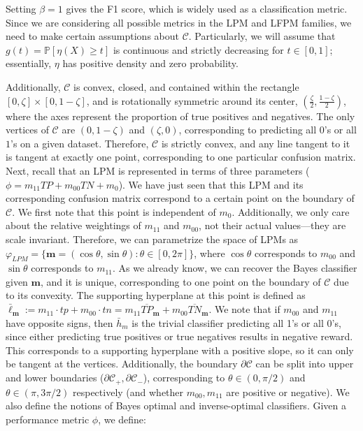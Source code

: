 \documentclass[
  letterpaper,
  numbers=noenddot,
  DIV=11]{scrreprt}
\theoremstyle{plain}
\theoremstyle{definition}
\theoremstyle{remark}
\begin{document}
Setting \(\beta = 1\) gives the F1 score, which is widely used as a
classification metric. Since we are considering all possible metrics in
the LPM and LFPM families, we need to make certain assumptions about
\(\mathcal{C}\). Particularly, we will assume that
\(g(t) = \mathbb{P}[\eta(X) \geq t]\) is continuous and strictly
decreasing for \(t \in [0, 1]\); essentially, \(\eta\) has positive
density and zero probability.

Additionally, \(\mathcal{C}\) is convex, closed, and contained within
the rectangle \([0, \zeta] \times [0, 1-\zeta]\), and is rotationally
symmetric around its center, \((\frac{\zeta}{2}, \frac{1-\zeta}{2})\),
where the axes represent the proportion of true positives and negatives.
The only vertices of \(\mathcal{C}\) are \((0, 1-\zeta)\) and
\((\zeta, 0)\), corresponding to predicting all \(0\)'s or all \(1\)'s
on a given dataset. Therefore, \(\mathcal{C}\) is strictly convex, and
any line tangent to it is tangent at exactly one point, corresponding to
one particular confusion matrix. Next, recall that an LPM is represented
in terms of three parameters (\(\phi = m_{11}TP + m_{00}TN + m_0\)). We
have just seen that this LPM and its corresponding confusion matrix
correspond to a certain point on the boundary of \(\mathcal{C}\). We
first note that this point is independent of \(m_0\). Additionally, we
only care about the relative weightings of \(m_{11}\) and \(m_{00}\),
not their actual values---they are scale invariant. Therefore, we can
parametrize the space of LPMs as
\(\varphi_{LPM} = \{\mathbf{m} = (\cos \theta, \sin \theta) : \theta \in [0, 2\pi]\}\),
where \(\cos \theta\) corresponds to \(m_{00}\) and \(\sin \theta\)
corresponds to \(m_{11}\). As we already know, we can recover the Bayes
classifier given \(\mathbf{m}\), and it is unique, corresponding to one
point on the boundary of \(\mathcal{C}\) due to its convexity. The
supporting hyperplane at this point is defined as
\(\bar{\ell}_{\mathbf{m}} := m_{11} \cdot tp + m_{00} \cdot tn = m_{11} \overline{TP}_{\mathbf{m}} + m_{00} \overline{TN}_{\mathbf{m}}\).
We note that if \(m_{00}\) and \(m_{11}\) have opposite signs, then
\(\bar{h}_m\) is the trivial classifier predicting all 1's or all 0's,
since either predicting true positives or true negatives results in
negative reward. This corresponds to a supporting hyperplane with a
positive slope, so it can only be tangent at the vertices. Additionally,
the boundary \(\partial \mathcal{C}\) can be split into upper and lower
boundaries (\(\partial \mathcal{C}_{+}, \partial \mathcal{C}_{-}\)),
corresponding to \(\theta \in (0, \pi/2)\) and
\(\theta \in (\pi, 3\pi/2)\) respectively (and whether
\(m_{00}, m_{11}\) are positive or negative). We also define the notions
of Bayes optimal and inverse-optimal classifiers. Given a performance
metric \(\phi\), we define:
\end{document}
